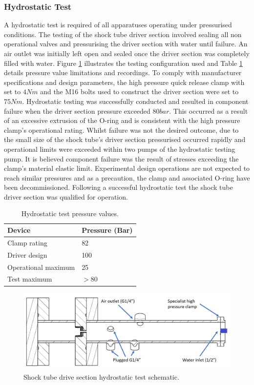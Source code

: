 \subsubsection{Hydrostatic Test}

A hydrostatic test is required of all apparatuses operating under pressurised conditions. The testing of the shock tube driver section involved sealing all non operational valves and pressurising the driver section with water until failure. An air outlet was initially left open and sealed once the driver section was completely filled with water. Figure \ref{fig:hydro_test} illustrates the testing configuration used and Table \ref{tab:hydro} details pressure value limitations and recordings. To comply with manufacturer specifications and design parameters, the high pressure quick release clamp with set to $4Nm$ and the M16 bolts used to construct the driver section were set to $75Nm$. Hydrostatic testing was successfully conducted and resulted in component failure when the driver section pressure exceeded $80bar$. This occurred as a result of an excessive extrusion of the O-ring and is consistent with the high pressure clamp's operational rating. Whilst failure was not the desired outcome, due to the small size of the shock tube's driver section pressurised occurred rapidly and operational limits were exceeded within two pumps of the hydrostatic testing pump. It is believed component failure was the result of stresses exceeding the clamp's material elastic limit. Experimental design operations are not expected to reach similar pressures and as a precaution, the clamp and associated O-ring have been decommissioned. Following a successful hydrostatic test the shock tube driver section was qualified for operation.


\begin{table}[h]
\centering
\caption{Hydrostatic test pressure values.}
\label{tab:hydro}
\begin{tabular}{@{}ll@{}}
\toprule
Device              & Pressure (Bar) \\ \midrule
Clamp rating        & 82             \\
Driver design       & 100            \\
Operational maximum & 25             \\
Test maximum        & $>80$          \\ \bottomrule
\end{tabular}
\end{table}

\begin{figure}[H] 
	\centering
	\includegraphics[width=1\textwidth]{hydro_test.png} 
	\caption{Shock tube drive section hydrostatic test schematic.}
	\label{fig:hydro_test}
\end{figure}

